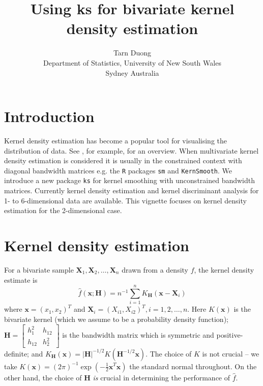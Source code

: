 \documentclass[a4paper,11pt]{article}
\title{Using ks for bivariate kernel density estimation}
\author{Tarn Duong \\Department of Statistics, University of New South Wales\\ Sydney Australia}
\renewcommand{\vec}[1]{\boldsymbol{#1}}
\newcommand{\mat}[1]{\mathbf{#1}}
\def\HH{\mat{H}}
\def\vecx{\vec{x}}
\def\vecX{\vec{X}}
\begin{document}
\maketitle

\section{Introduction}
  
Kernel density estimation has become a popular tool for visualising 
the distribution of data. See \citet*{simonoff96}, for example, for an overview. 
When multivariate kernel density estimation is considered it is usually
in the constrained context with diagonal bandwidth matrices 
e.g. the \texttt{R} packages \texttt{sm} and \texttt{KernSmooth}.  
We introduce a new package \texttt{ks} for 
kernel smoothing with unconstrained bandwidth
matrices. Currently kernel density estimation and kernel discriminant
analysis for 1- to 6-dimensional data  are available.  
This vignette focuses on kernel density estimation for the 2-dimensional case.

\section{Kernel density estimation}

For a bivariate sample $\vecX_1, \vecX_2, \ldots, \vecX_n$ drawn from a density $f$, 
the kernel density estimate is 
\begin{equation}
\hat{f} (\vecx; \HH) = n^{-1}\sum_{i=1}^n K_{\HH} ( \vecx - \vec{X}_i)
\label{eq:kde}
\end{equation}
where $\vecx = (x_1, x_2)^T$ and $\vec{X}_i = (X_{i1}, X_{i2})^T, i = 1, 2,  
\ldots, n$.  
Here 
$K(\vecx)$ is the bivariate kernel (which we assume to be a probability density 
function); $\HH = \begin{bmatrix}h_1^2 & h_{12} \\ h_{12}& h_2^2 \end{bmatrix}$ 
is the bandwidth matrix which is symmetric and positive-definite; 
and $K_{\HH}(\vecx) = |\HH|^{-1/2} 
K( \HH^{-1/2} \vecx)$. 
The choice of $K$ is not crucial -- we take 
$K(\vecx) = (2\pi)^{-1} \exp(-\tfrac{1}{2} \vecx^T \vecx)$ the standard normal
throughout.  
On the other hand, the choice of $\HH$ \emph{is} crucial in determining 
the performance of $\hat f$. 
\end{document}
